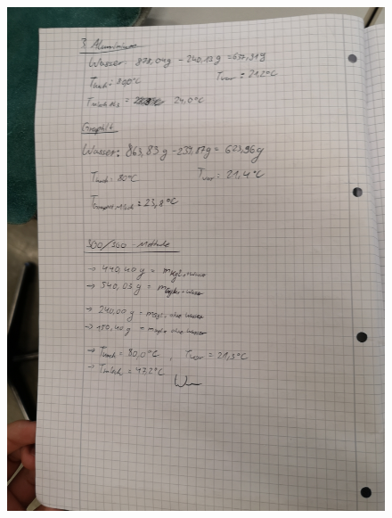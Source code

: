 \begin{figure}[htbp]
    \centering
    \includegraphics[width=\textwidth]{content/Bilder/Daten2.jpg}
\end{figure}